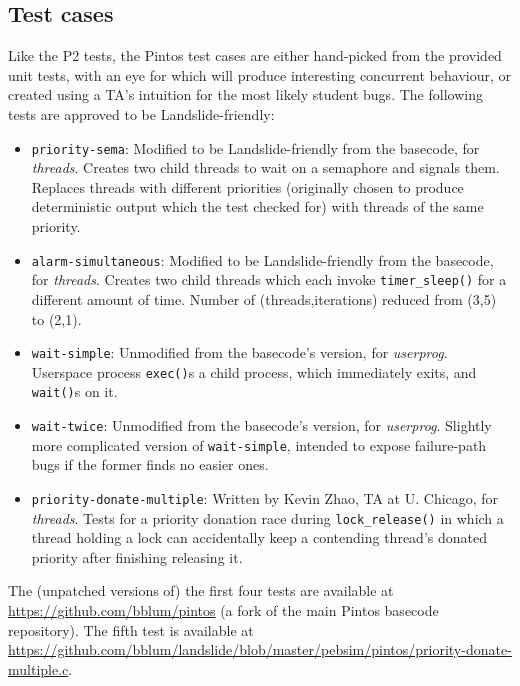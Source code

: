 \subsection{Test cases}
\label{sec:education-pintos-tests}

Like the P2 tests, the Pintos test cases are either hand-picked from the provided unit tests,
with an eye for which will produce interesting concurrent behaviour,
or created using a TA's intuition for the most likely student bugs.
The following tests are approved to be Landslide-friendly:

\begin{itemize}
	\item {\tt priority-sema}:
		Modified to be Landslide-friendly from the basecode, for {\em threads}.
		Creates two child threads to wait on a semaphore and signals them.
		Replaces threads with different priorities
		(originally chosen to produce deterministic output which the test checked for)
		with threads of the same priority.
	\item {\tt alarm-simultaneous}:
		Modified to be Landslide-friendly from the basecode, for {\em threads}.
		Creates two child threads which each invoke {\tt timer\_sleep()} for a different amount of time.
		Number of (threads,iterations) reduced from (3,5) to (2,1).
	\item {\tt wait-simple}:
		Unmodified from the basecode's version, for {\em userprog}.
		Userspace process {\tt exec()}s a child process, which immediately exits, and {\tt wait()}s on it.
	\item {\tt wait-twice}:
		Unmodified from the basecode's version, for {\em userprog}.
		Slightly more complicated version of {\tt wait-simple},
		intended to expose failure-path bugs if the former finds no easier ones.
	\item {\tt priority-donate-multiple}:
		Written by Kevin Zhao, TA at U. Chicago, for {\em threads}.
		Tests for a priority donation race during {\tt lock\_release()}
		in which a thread holding a lock can accidentally keep a contending thread's donated priority
		after finishing releasing it.
\end{itemize}
\vspace{1em}

The (unpatched versions of) the first four tests are available at
\url{https://github.com/bblum/pintos} (a fork of the main Pintos basecode repository).
The fifth test is available at
\url{https://github.com/bblum/landslide/blob/master/pebsim/pintos/priority-donate-multiple.c}.

